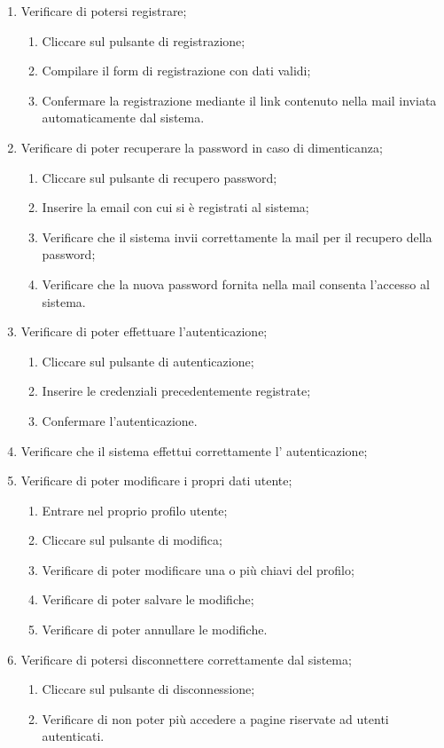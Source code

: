 \begin{enumerate}
\item Verificare di potersi registrare;
\begin{enumerate}
\item Cliccare sul pulsante di registrazione;
\item Compilare il form di registrazione con dati validi;
\item Confermare la registrazione mediante il link contenuto nella mail inviata automaticamente dal sistema.
\end{enumerate}
\item Verificare di poter recuperare la password in caso di dimenticanza;
\begin{enumerate}
\item Cliccare sul pulsante di recupero password;
\item Inserire la email con cui si è registrati al sistema;
\item Verificare che il sistema invii correttamente la mail per il recupero della password;
\item Verificare che la nuova password fornita nella mail consenta l'accesso al sistema.
\end{enumerate}
\item Verificare di poter effettuare l'autenticazione;
\begin{enumerate}
\item Cliccare sul pulsante di autenticazione;
\item Inserire le credenziali precedentemente registrate;
\item Confermare l'autenticazione.
\end{enumerate}
\item Verificare che il sistema effettui correttamente l' autenticazione;
\item Verificare di poter modificare i propri dati utente;
\begin{enumerate}
\item Entrare nel proprio profilo utente;
\item Cliccare sul pulsante di modifica;
\item Verificare di poter modificare una o più chiavi del profilo;
\item Verificare di poter salvare le modifiche;
\item Verificare di poter annullare le modifiche.
\end{enumerate}
\item Verificare di potersi disconnettere correttamente dal sistema;
\begin{enumerate}
\item Cliccare sul pulsante di disconnessione;
\item Verificare di non poter più accedere a pagine riservate ad utenti autenticati.
\end{enumerate}
\end{enumerate}


